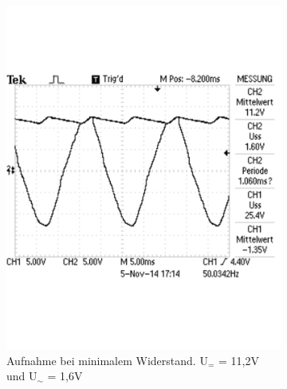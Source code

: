 \documentclass[12pt,a4paper]{article}
\begin{document}
\begin{figure}[H]
        \centering
        \begin{subfigure}[b]{0.48\textwidth}
                \includegraphics[width=\textwidth , scale = 0.4]{2_5_100F_1.pdf}
                \caption[Aufnahme bei minimalem Widerstand. U$_{=}$ = 11,2V und U$_\sim$ = 1,6V]{Aufnahme bei minimalem Widerstand. U$_{=}$ = 11,2V und U$_\sim$ = 1,6V}
 				 \label{fig:2_5_100F_1}
        \end{subfigure}%
        \hfill
        \begin{subfigure}[b]{0.48\textwidth}

\end{subfigure}
\end{figure}
\end{document}
